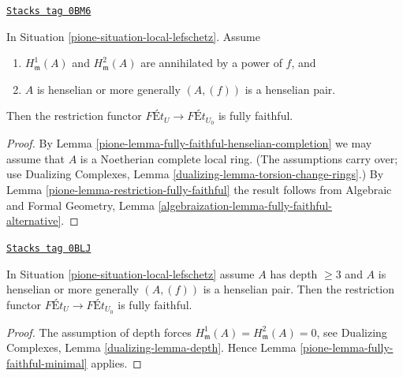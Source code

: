 \begin{lemma}
\label{pione-lemma-fully-faithful-minimal}
\href{https://stacks.math.columbia.edu/tag/0BM6}{\texttt{Stacks tag 0BM6}}

\begin{reference}
\cite[Corollary 1.11]{Bhatt-local}
\end{reference}
In Situation \ref{pione-situation-local-lefschetz}. Assume
\begin{enumerate}
\item $H^1_\mathfrak m(A)$ and $H^2_\mathfrak m(A)$ are
annihilated by a power of $f$, and
\item $A$ is henselian or more generally $(A, (f))$ is a henselian pair.
\end{enumerate}
Then the restriction functor
$\textit{F\'Et}_U \longrightarrow \textit{F\'Et}_{U_0}$
is fully faithful.
\end{lemma}

\begin{proof}

By Lemma \ref{pione-lemma-fully-faithful-henselian-completion}
we may assume that $A$ is a Noetherian complete local ring.
(The assumptions carry over; use
Dualizing Complexes, Lemma \ref{dualizing-lemma-torsion-change-rings}.)
By Lemma \ref{pione-lemma-restriction-fully-faithful}
the result follows from
Algebraic and Formal Geometry, Lemma
\ref{algebraization-lemma-fully-faithful-alternative}.
\end{proof}

\begin{lemma}
\label{pione-lemma-fully-faithful}
\href{https://stacks.math.columbia.edu/tag/0BLJ}{\texttt{Stacks tag 0BLJ}}

In Situation \ref{pione-situation-local-lefschetz} assume $A$ has depth $\geq 3$
and $A$ is henselian or more generally $(A, (f))$ is a henselian pair. Then
the restriction functor
$\textit{F\'Et}_U \to \textit{F\'Et}_{U_0}$
is fully faithful.
\end{lemma}

\begin{proof}

The assumption of depth forces
$H^1_\mathfrak m(A) = H^2_\mathfrak m(A) = 0$, see
Dualizing Complexes, Lemma \ref{dualizing-lemma-depth}.
Hence Lemma \ref{pione-lemma-fully-faithful-minimal} applies.
\end{proof}

